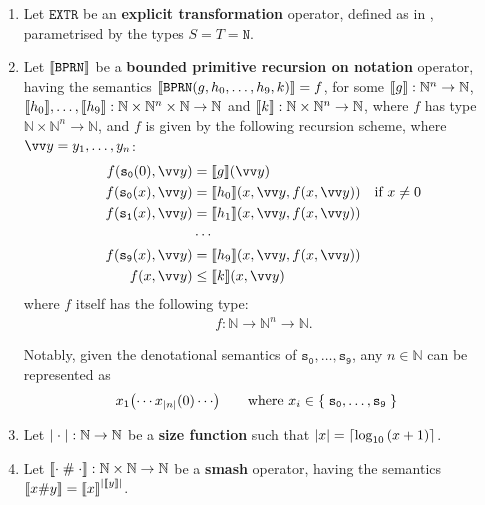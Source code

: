 \begin{definition}
\begin{enumerate}[label=(\arabic*)]
\item Let $\mathtt{EXTR}$ be an \textbf{explicit transformation} operator,
defined as in , parametrised by the types
$S=T=\mathtt{N}$.

\item Let ${\mathopen{}\left\llbracket{\mathtt{BPRN}}\right\rrbracket\mathclose{}}$ be a \textbf{bounded primitive recursion on
notation} operator, having the semantics
${\mathopen{}\left\llbracket{\mathtt{BPRN}{\ensuremath{\mathopen{}\left({g,h_0,\ldots,h_9,k}\right)\mathclose{}}}}\right\rrbracket\mathclose{}} = f$, for some ${\mathopen{}\left\llbracket{g}\right\rrbracket\mathclose{}} :
\mathbb{N}^n \rightarrow \mathbb{N}$, ${\mathopen{}\left\llbracket{h_0}\right\rrbracket\mathclose{}}, \ldots, {\mathopen{}\left\llbracket{h_9}\right\rrbracket\mathclose{}} :
\mathbb{N} \times \mathbb{N}^n \times \mathbb{N} \rightarrow \mathbb{N}$ and
${\mathopen{}\left\llbracket{k}\right\rrbracket\mathclose{}} : \mathbb{N} \times \mathbb{N}^n \rightarrow \mathbb{N}$, where $f$
has type $\mathbb{N} \times \mathbb{N}^n \rightarrow \mathbb{N}$, and $f$ is
given by the following recursion scheme, where $\vect{y} =
y_1,\ldots,y_n$:\begin{align*}
%
f\p{\mathtt{s_0}\p{0}, \vect{y}} &= \sem{g}\p{\vect{y}} \\
%
f\p{\mathtt{s_0}\p{x}, \vect{y}} &= \sem{h_0}\p{x, \vect{y}, f\p{x, \vect{y}}}
& \text{if $x\neq 0$}\\
%
f\p{\mathtt{s_1}\p{x}, \vect{y}} &= \sem{h_1}\p{x, \vect{y}, f\p{x, \vect{y}}}
\\
%
&\cdots \\
%
f\p{\mathtt{s_9}\p{x}, \vect{y}} &= \sem{h_9}\p{x, \vect{y}, f\p{x, \vect{y}}}
\\
%
f\p{x, \vect{y}} &\leq \sem{k}\p{x, \vect{y}}
%
\end{align*} where $f$ itself has the following type:\begin{align*}
%
f : \mathbb{N} \rightarrow \mathbb{N}^n \rightarrow \mathbb{N}.
%
\end{align*}

Notably, given the denotational semantics of
$\mathtt{s_0},\ldots,\mathtt{s_9}$, any $n \in \mathbb{N}$ can be represented
as \begin{align*}
%
x_1\p{\cdots x_{\card{n}}\p{0} \cdots} & \quad \quad \text{where $x_i \in
\set{\mathtt{s_0}, \ldots, \mathtt{s_9}}$}
%
\end{align*}



\item Let ${\mathopen{}\left|{\mathrel{}\cdot\mathrel{}}\right|\mathclose{}} : \mathbb{N} \rightarrow
\mathbb{N}$ be a \textbf{size function} such that ${\mathopen{}\left|{x}\right|\mathclose{}} =
\mathopen{}\left\lceil{\log_{10}{\ensuremath{\mathopen{}\left({x+1}\right)\mathclose{}}}}\right\rceil\mathclose{}$.

\item Let ${\mathopen{}\left\llbracket{\ensuremath{\cdot}\; \ensuremath{\mathtt{\#}}{} \; \ensuremath{\cdot}}\right\rrbracket\mathclose{}} : \mathbb{N} \times
\mathbb{N} \rightarrow \mathbb{N}$ be a \textbf{smash} operator, having the
semantics ${\mathopen{}\left\llbracket{x \ensuremath{\mathtt{\#}}{} y}\right\rrbracket\mathclose{}} = {\mathopen{}\left\llbracket{x}\right\rrbracket\mathclose{}}^{\mathopen{}\left|{{\mathopen{}\left\llbracket{y}\right\rrbracket\mathclose{}}}\right|\mathclose{}}$.


\end{enumerate}
\end{definition}
